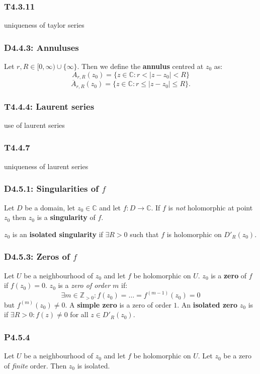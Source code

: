\documentclass{article}
\begin{document}
\begin{multicols*}{3}
\subsubsection*{T4.3.11}
uniqueness of taylor series

\newcolumn

\subsubsection*{D4.4.3: Annuluses}
Let $r,R\in[0,\infty)\cup\{\infty\}$. Then we define the
\textbf{annulus} centred at $z_0$ as:
$$A_{r,R}(z_0)=\{z\in\mathbb{C}:r<|z-z_0|<R\}$$
$$\overline{A}_{r,R}(z_0)=\{z\in\mathbb{C}:r\leq|z-z_0|\leq R\}.$$

\subsubsection*{T4.4.4: Laurent series}
use of laurent series

\subsubsection*{T4.4.7}
uniqueness of laurent series

\newcolumn

\subsubsection*{D4.5.1: Singularities of $f$}
Let $D$ be a domain, let $z_0\in\mathbb{C}$ and let
$f:D\rightarrow\mathbb{C}$. If $f$ is \textit{not} holomorphic
at point $z_0$ then $z_0$ is a \textbf{singularity} of $f$.

$z_0$ is an \textbf{isolated singularity} if $\exists R>0$
such that $f$ is holomorphic on $D'_R(z_0)$.

\subsubsection*{D4.5.3: Zeros of $f$}
Let $U$ be a neighbourhood of $z_0$ and let $f$ be holomorphic on $U$.
$z_0$ is a \textbf{zero} of $f$ if $f(z_0)=0$.
$z_0$ is a \textit{zero of order $m$} if:
$$\exists m\in\mathbb{Z}_{>0}:f(z_0)=\dots=f^{(m-1)}(z_0)=0$$
but $f^{(m)}(z_0)\neq0$. A \textbf{simple zero} is a zero of order $1$.
An \textbf{isolated zero} $z_0$ is if $\exists R>0:f(z)\neq0$ for all
$z\in D'_R(z_0)$.

\subsubsection*{P4.5.4}
Let $U$ be a neighbourhood of $z_0$ and let $f$ be holomorphic
on $U$. Let $z_0$ be a zero of \textit{finite} order.
Then $z_0$ is isolated.


\end{multicols*}
\end{document}
